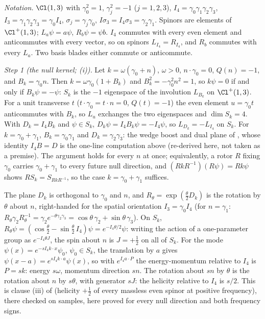 \emph{Notation.} $\Cl(1,3)$ with $\gamma_{0}^{2} = 1$, $\gamma_{j}^{2} = -1$ ($j = 1, 2, 3$), $I_{4} = \gamma_{0}\gamma_{1}\gamma_{2}\gamma_{3}$, $I_{3} = \gamma_{1}\gamma_{2}\gamma_{3} = \gamma_{0}I_{4}$, $\sigma_{j} = \gamma_{j}\gamma_{0}$, $I\sigma_{3} = I_{4}\sigma_{3} = \gamma_{2}\gamma_{1}$. Spinors are elements of $\Cl^{+}(1,3)$; $L_{a}\psi = a\psi$, $R_{b}\psi = \psi b$. $I_{4}$ commutes with every even element and anticommutes with every vector, so on spinors $L_{I_{4}} = R_{I_{4}}$, and $R_{b}$ commutes with every $L_{a}$. Two basis blades either commute or anticommute.

\emph{Step 1 (the null kernel; (i)).} Let $k = \omega(\gamma_{0} + n)$, $\omega > 0$, $n \cdot \gamma_{0} = 0$, $Q(n) = -1$, and $B_{k} = \gamma_{0}n$. Then $k = \omega\gamma_{0}(1 + B_{k})$ and $B_{k}^{2} = -\gamma_{0}^{2}n^{2} = 1$, so $k\psi = 0$ if and only if $B_{k}\psi = -\psi$: $S_{k}$ is the $-1$ eigenspace of the involution $L_{B_{k}}$ on $\Cl^{+}(1,3)$. For a unit transverse $t$ ($t \cdot \gamma_{0} = t \cdot n = 0$, $Q(t) = -1$) the even element $u = \gamma_{0}t$ anticommutes with $B_{k}$, so $L_{u}$ exchanges the two eigenspaces and $\dim S_{k} = 4$. With $D_{k} = I_{4}B_{k}$ and $\psi \in S_{k}$, $D_{k}\psi = I_{4}B_{k}\psi = -I_{4}\psi$, so $L_{D_{k}} = -L_{I_{4}}$ on $S_{k}$. For $k = \gamma_{0} + \gamma_{1}$, $B_{k} = \gamma_{0}\gamma_{1}$ and $D_{k} = \gamma_{2}\gamma_{3}$: the wedge boost and dual plane of , whose identity $I_{4}B = D$ is the one-line computation above (re-derived here, not taken as a premise). The argument holds for every $n$ at once; equivalently, a rotor $R$ fixing $\gamma_{0}$ carries $\gamma_{0} + \gamma_{1}$ to every future null direction, and $(RkR^{-1})(R\psi) = Rk\psi$ shows $RS_{k} = S_{RkR^{-1}}$, so the case $k = \gamma_{0} + \gamma_{1}$ suffices.

The plane $D_{k}$ is orthogonal to $\gamma_{0}$ and $n$, and $R_{\theta} = \exp(\tfrac{\theta}{2}D_{k})$ is the rotation by $\theta$ about $n$, right-handed for the spatial orientation $I_{3} = \gamma_{0}I_{4}$ (for $n = \gamma_{1}$: $R_{\theta}\gamma_{2}R_{\theta}^{-1} = \gamma_{2}e^{-\theta\gamma_{2}\gamma_{3}} = \cos\theta\,\gamma_{2} + \sin\theta\,\gamma_{3}$). On $S_{k}$, $R_{\theta}\psi = (\cos\tfrac{\theta}{2} - \sin\tfrac{\theta}{2}\,I_{4})\psi = e^{-I_{4}\theta/2}\psi$: writing the action of a one-parameter group as $e^{-I_{4}\theta J}$, the spin about $n$ is $J = +\tfrac12$ on all of $S_{k}$. For the mode $\psi(x) = e^{-sI_{4}k\cdot x}\psi_{0}$, $\psi_{0} \in S_{k}$, the translation by $a$ gives $\psi(x - a) = e^{sI_{4}k\cdot a}\psi(x)$, so with $e^{I_{4}a\cdot P}$ the energy-momentum relative to $I_{4}$ is $P = sk$: energy $s\omega$, momentum direction $sn$. The rotation about $sn$ by $\theta$ is the rotation about $n$ by $s\theta$, with generator $sJ$: the helicity relative to $I_{4}$ is $s/2$. This is clause (iii) of  (helicity $+\tfrac12$ of every massless even spinor at positive frequency), there checked on samples, here proved for every null direction and both frequency signs.

